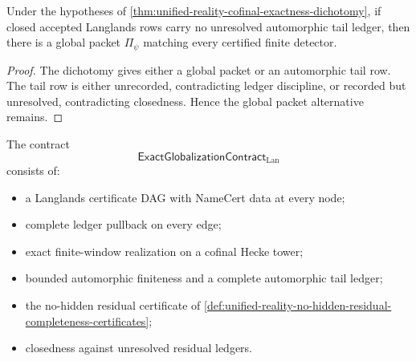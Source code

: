 \begin{corollary}
\label{cor:unified-reality-closed-cofinal-exactness-global-packet}
Under the hypotheses of
\autoref{thm:unified-reality-cofinal-exactness-dichotomy}, if closed
accepted Langlands rows carry no unresolved automorphic tail ledger,
then there is a global packet $\Pi_\psi$ matching every certified finite
detector.
\end{corollary}
\begin{proof}
The dichotomy gives either a global packet or an automorphic tail row.
The tail row is either unrecorded, contradicting ledger discipline, or
recorded but unresolved, contradicting closedness. Hence the global
packet alternative remains.
\end{proof}

\begin{definition}
\label{def:unified-reality-exact-globalization-contract-lan}
The contract
$$
\mathsf{ExactGlobalizationContract}_{\mathrm{Lan}}
$$
consists of:
\begin{itemize}
\item a Langlands certificate DAG with NameCert data at every node;
\item complete ledger pullback on every edge;
\item exact finite-window realization on a cofinal Hecke tower;
\item bounded automorphic finiteness and a complete automorphic tail
ledger;
\item the no-hidden residual certificate of
\autoref{def:unified-reality-no-hidden-residual-completeness-certificates};
\item closedness against unresolved residual ledgers.
\end{itemize}
\end{definition}


